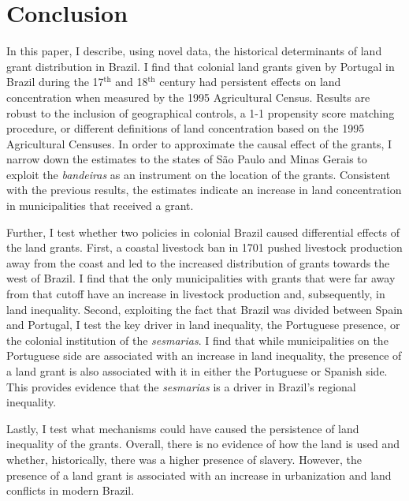 \documentclass[11pt]{article}
\begin{document}


\section{Conclusion}
\label{sec:conclusion}

In this paper, I describe, using novel data, the historical determinants of land grant distribution in Brazil. 
I find that colonial land grants given by Portugal in Brazil during the 17$^\text{th}$ and 18$^\text{th}$ century had persistent effects on land concentration when measured by the 1995 Agricultural Census.
Results are robust to the inclusion of geographical controls, a 1-1 propensity score matching procedure, or different definitions of land concentration based on the 1995 Agricultural Censuses.
In order to approximate the causal effect of the grants, I narrow down the estimates to the states of São Paulo and Minas Gerais to exploit the \textit{bandeiras} as an instrument on the location of the grants. 
Consistent with the previous results, the estimates indicate an increase in land concentration in municipalities that received a grant.

Further, I test whether two policies in colonial Brazil caused differential effects of the land grants. 
First, a coastal livestock ban in 1701 pushed livestock production away from the coast and led to the increased distribution of grants towards the west of Brazil.
I find that the only municipalities with grants that were far away from that cutoff have an increase in livestock production and, subsequently, in land inequality.
Second, exploiting the fact that Brazil was divided between Spain and Portugal, I test the key driver in land inequality, the Portuguese presence, or the colonial institution of the \textit{sesmarias}. 
I find that while municipalities on the Portuguese side are associated with an increase in land inequality, the presence of a land grant is also associated with it in either the Portuguese or Spanish side.
This provides evidence that the \textit{sesmarias} is a driver in Brazil's regional inequality.

Lastly, I test what mechanisms could have caused the persistence of land inequality of the grants.
Overall, there is no evidence of how the land is used and whether, historically, there was a higher presence of slavery.
However, the presence of a land grant is associated with an increase in urbanization and land conflicts in modern Brazil.
\end{document}
